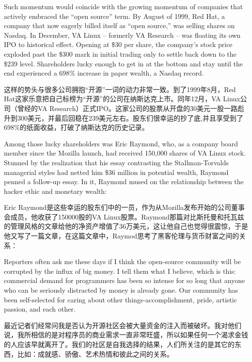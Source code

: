 \ifdefined\eng
Such momentum would coincide with the growing momentum of companies that actively embraced the ``open source'' term. By August of 1999, Red Hat, a company that now eagerly billed itself as ``open source,'' was selling shares on Nasdaq. In December, VA Linux -- formerly VA Research -- was floating its own IPO to historical effect. Opening at \$30 per share, the company's stock price exploded past the \$300 mark in initial trading only to settle back down to the \$239 level. Shareholders lucky enough to get in at the bottom and stay until the end experienced a 698\% increase in paper wealth, a Nasdaq record.
\fi

\ifdefined\chs
这样的势头与很多公司拥抱“开源”一词的动力非常一致。到了1999年8月，Red Hat这家乐意把自己标榜为“开源”的公司在纳斯达克上市。同年12月，VA Linux公司（曾经的VA Research）正式IPO。这家公司的股票从开盘的30美元一股一路彪升到300美元，并最后回稳在239美元左右。股东们很幸运的抄了底,并且享受到了698\%的纸面收益，打破了纳斯达克的历史记录。
\fi

\ifdefined\eng
Among those lucky shareholders was Eric Raymond, who, as a company board member since the Mozilla launch, had received 150,000 shares of VA Linux stock. Stunned by the realization that his essay contrasting the Stallman-Torvalds managerial styles had netted him \$36 million in potential wealth, Raymond penned a follow-up essay. In it, Raymond mused on the relationship between the hacker ethic and monetary wealth:
\fi

\ifdefined\chs
Eric Raymond是这些幸运的股东们中的一员，作为从Mozilla发布开始的公司董事会成员，他收获了150000股的VA Linux股票。Raymond那篇对比斯托曼和托瓦兹的管理风格的文章给他的净资产增值了36万美元，这让他自己也觉得很震惊，于是他又写了一篇文章，在这篇文章中，Raymod思考了黑客伦理与货币财富之间的关系：
\fi

\ifdefined\eng
Reporters often ask me these days if I think the open-source community will be corrupted by the influx of big money. I tell them what I believe, which is this: commercial demand for programmers has been so intense for so long that anyone who can be seriously distracted by money is already gone. Our community has been self-selected for caring about other things-accomplishment, pride, artistic passion, and each other.\endnote{}
\fi

\ifdefined\chs
最近记者们经常问我是否认为开源社区会被大量资金的注入而被破坏。我对他们说，我所相信的是对程序员的商业需求一直非常旺盛，所以如果任何一个渴求金钱的人应该早就离开了。我们的社区是自我选择的结果，人们所关注的是其它的东西，比如：成就感、骄傲、艺术热情和彼此之间的关系。\endnote{}
\fi


